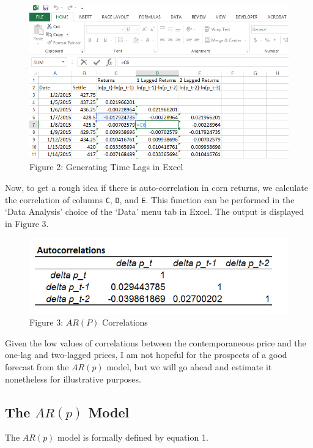 \documentclass[]{book}
\theoremstyle{definition}
\theoremstyle{definition}
\theoremstyle{remark}
\begin{document}
\begin{figure}[htbp]
\centering
\includegraphics{images/12.lags.png}
\caption{Figure 2: Generating Time Lags in Excel}
\end{figure}

Now, to get a rough idea if there is auto-correlation in corn returns,
we calculate the correlation of columns \texttt{C}, \texttt{D}, and
\texttt{E}. This function can be performed in the `Data Analysis' choice
of the `Data' menu tab in Excel. The output is displayed in Figure 3.

\begin{figure}[htbp]
\centering
\includegraphics{images/12_corn_autocorrel.png}
\caption{Figure 3: \(AR(P)\) Correlations}
\end{figure}

Given the low values of correlations between the contemporaneous price
and the one-lag and two-lagged prices, I am not hopeful for the
prospects of a good forecast from the \(AR(p)\) model, but we will go
ahead and estimate it nonetheless for illustrative purposes.

\subsection{\texorpdfstring{The \(AR(p)\)
Model}{The AR(p) Model}}\label{the-arp-model}

The \(AR(p)\) model is formally defined by equation 1.
\end{document}
